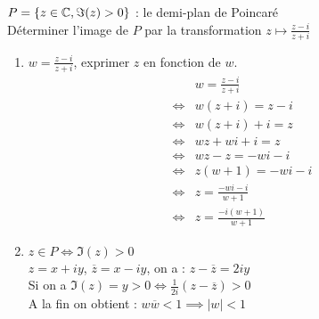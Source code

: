 \begin{leftstroke}
\begin{exemple}
    $P = \left\{ z \in \mathbb{C}, \Im{(z)} > 0\right\}$ : le demi-plan de Poincaré    
    \\
    Déterminer l'image de $P$ par la transformation $z \mapsto \frac{z - i}{z + i}$
    \\
    \begin{enumerate}
        \item $w = \frac{z - i}{z + i}$, exprimer $z$ en fonction de $w$.
            \begin{align*}
                &w = \frac{z - i}{z + i} \\
                \iff &w(z + i) = z - i \\
                \iff &w(z + i) + i = z \\
                \iff &wz + wi + i = z \\
                \iff &wz - z = -wi - i \\
                \iff &z(w + 1) = -wi - i \\
                \iff &z = \frac{-wi - i}{w + 1} \\
                \iff &z = \frac{-i(w + 1)}{w + 1} 
            \end{align*}
        \item $z \in P \iff \Im{(z)} > 0$ 
            \\
            $z = x + iy$, $\overline{z} = x - iy$, on a : $z - \overline{z} = 2iy$ \\
            Si on a $\Im{(z)} = y > 0 \iff \frac{1}{2i}(z - \overline{z}) > 0$
            \\
            A la fin on obtient : $w\overline{w} < 1 \implies |w| < 1$
    \end{enumerate}
\end{exemple}
\end{leftstroke}
